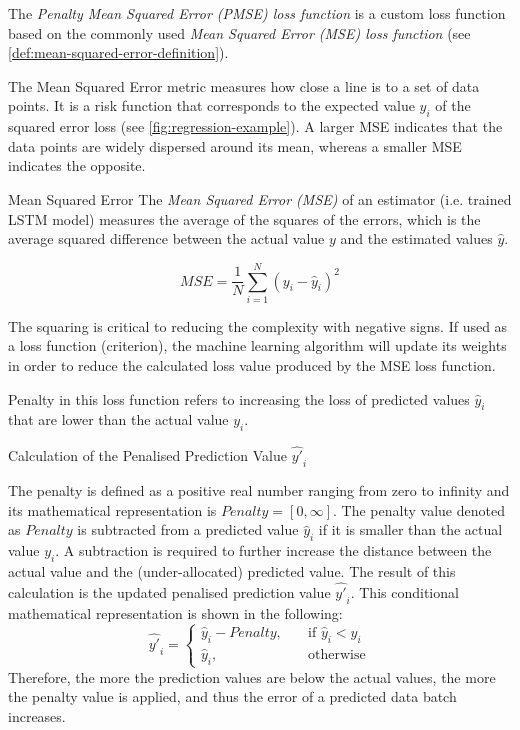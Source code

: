     The \emph{Penalty Mean Squared Error (PMSE) loss function} is a custom loss function based on the commonly used \emph{Mean Squared Error (MSE) loss function} \cite{koksoyMultiresponseRobustDesign2006} (see \ref{def:mean-squared-error-definition}). 
    
    The Mean Squared Error metric measures how close a  line is to a set of data points. It is a risk function that corresponds to the expected value $y_i$ of the squared error loss (see \ref{fig:regression-example}). A larger MSE indicates that the data points are widely dispersed around its mean, whereas a smaller MSE indicates the opposite.

    \begin{pabox}{Mean Squared Error}
    \label{def:mean-squared-error-definition}
      The \emph{Mean Squared Error (MSE)} of an estimator (i.e. trained LSTM model) measures the average of the squares of the errors, which is the average squared difference between the actual value $y$ and the estimated values $\hat{y}$.

      $$MSE = \frac{1}{N} \sum_{i = 1}^{N}\left(y_i - \hat{y}_i\right)^2$$

      The squaring is critical to reducing the complexity with negative signs. If used as a loss function (criterion), the machine learning algorithm will update its weights in order to reduce the calculated loss value produced by the MSE loss function.
    \end{pabox}

    Penalty in this loss function refers to increasing the loss of predicted values $\hat{y}_i$ that are lower than the actual value $y_i$.

    \begin{pabox}{Calculation of the Penalised Prediction Value $\hat{y'}_i$}
    \label{def:calculation-of-the-penalty-value}

      The penalty is defined as a positive real number ranging from zero to infinity and its mathematical representation is $Penalty = [0, \infty]$.
      The penalty value denoted as $Penalty$ is subtracted from a predicted value $\hat{y}_i$ if it is smaller than the actual value $y_i$. A subtraction is required to further increase the distance between the actual value and the (under-allocated) predicted value.
      The result of this calculation is the updated penalised prediction value $\hat{y'}_i$.
      This conditional mathematical representation is shown in the following:
      $$\hat{y'}_i = 
      \begin{cases}
        \hat{y}_i - Penalty, & \quad \textrm{if } \hat{y}_i < y_i \\
        \hat{y}_i,  & \quad \textrm{otherwise}
      \end{cases}$$
      Therefore, the more the prediction values are below the actual values, the more the penalty value is applied, and thus the error of a predicted data batch increases.

    \end{pabox}

